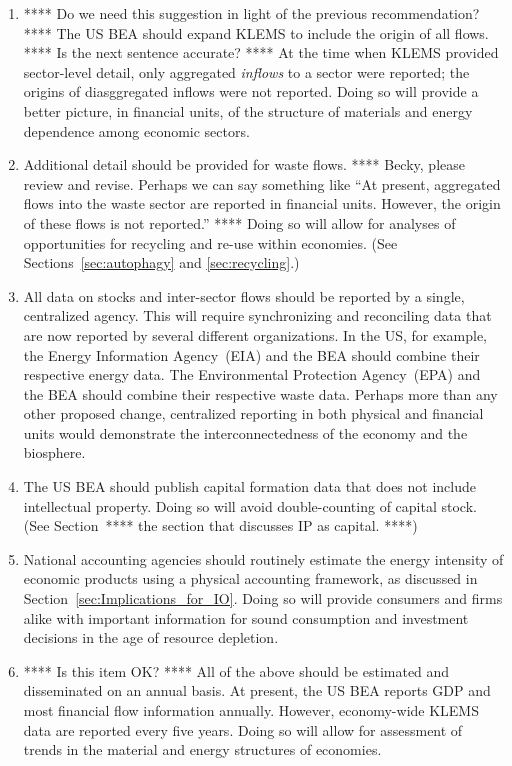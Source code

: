 \begin{enumerate}
	\item{**** Do we need this suggestion in light of the previous recommendation? ****
			The US BEA should expand KLEMS to include the origin of all flows.
			**** Is the next sentence accurate? **** 
			At the time when KLEMS provided sector-level detail, 
			only aggregated \emph{inflows} to a sector were reported;
			the origins of diasggregated inflows were not reported.
			Doing so will provide a better picture, in financial units,
			of the structure of materials and energy dependence among economic sectors.}

	\item{Additional detail should be provided for waste flows.
		 	**** Becky, please review and revise. 
			Perhaps we can say something like
			``At present, aggregated flows into the waste sector are reported in financial units. 
			However, the origin of these flows is not reported.'' ****
			Doing so will allow for analyses of opportunities for recycling and re-use
			within economies.
			(See Sections~\ref{sec:autophagy} and \ref{sec:recycling}.)}

	\item{All data on stocks and inter-sector flows should be reported by a single, 
			centralized agency.
			This will require synchronizing and reconciling data that are now reported
			by several different organizations. 
			In the US, for example, the Energy Information Agency~(EIA) and the BEA
			should combine their respective energy data.
			The Environmental Protection Agency~(EPA) and the BEA 
			should combine their respective waste data.
			Perhaps more than any other proposed change, 
			centralized reporting in both physical and financial units 
			would demonstrate the interconnectedness
			of the economy and the biosphere.}

	\item{The US BEA should publish capital formation data that does not include
			intellectual property. 
			Doing so will avoid double-counting of capital stock.
			(See Section~**** the section that discusses IP as capital. ****)}

	\item{National accounting agencies should routinely estimate 
			the energy intensity of economic products using a physical accounting framework,
			as discussed in Section~\ref{sec:Implications_for_IO}.
			Doing so will provide consumers and firms alike with important
			information for sound consumption and investment decisions 
			in the age of resource depletion.}

	\item{**** Is this item OK? ****
			All of the above should be estimated and disseminated on an annual basis.
			At present, the US BEA reports GDP and most financial flow information 
			annually.
			However, economy-wide KLEMS data are reported every five years.
			Doing so will allow for assessment of trends 
			in the material and energy structures of economies.}

\end{enumerate}

